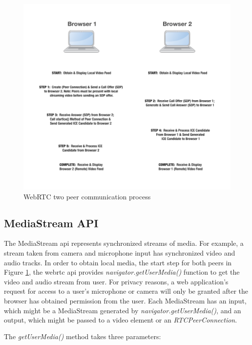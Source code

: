 \begin{figure}
	\centering
    	\includegraphics[height=0.50\textheight,natwidth=610,natheight=642]{figs/webrtc_diagram.png}
  	\caption{WebRTC two peer communication process\cite{mdn:p2pwebrtc}}
  	\label{fig:webrtc_diagram}
\end{figure}

\subsection{MediaStream API}

\par The MediaStream \gls{api} represents synchronized streams of media. For example, a stream taken from camera and microphone input has synchronized video and audio tracks. In order to obtain local media, the start step for both peers in Figure \ref{fig:webrtc_diagram}, the \gls{webrtc} \gls{api} provides \textit{navigator.getUserMedia()} function to get the video and audio stream from user. For privacy reasons, a web application’s request for access to a user’s microphone or camera will only be granted after the browser has obtained permission from the user. Each MediaStream has an input, which might be a MediaStream generated by \textit{navigator.getUserMedia()}, and an output, which might be passed to a video element or an \textit{RTCPeerConnection}.
\par The \textit{getUserMedia()} method takes three parameters:

